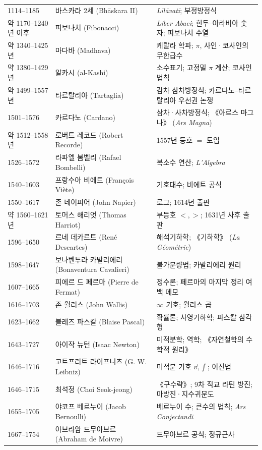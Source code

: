 \begin{center}
\begin{longtable}{@{}L{0.16\textwidth}L{0.24\textwidth}L{0.52\textwidth}@{}}
1114--1185 & 바스카라 2세 (Bhāskara II) & \textit{Līlāvatī}; 부정방정식\\
약 1170--1240년 이후 & 피보나치 (Fibonacci) & \textit{Liber Abaci}; 힌두--아라비아 숫자; 피보나치 수열\\
약 1340--1425년 & 마다바 (Madhava) & 케랄라 학파; $\pi$, 사인·코사인의 무한급수\\
약 1380--1429년 & 알카시 (al-Kashi) & 소수표기; 고정밀 $\pi$ 계산; 코사인 법칙\\
약 1499--1557년 & 타르탈리아 (Tartaglia) & 감차 삼차방정식; 카르다노--타르탈리아 우선권 논쟁\\
1501--1576 & 카르다노 (Cardano) & 삼차·사차방정식; 《아르스 마그나》 (\textit{Ars Magna})\\
약 1512--1558년 & 로버트 레코드 (Robert Recorde) & 1557년 등호 $=$ 도입\\
1526--1572 & 라파엘 봄벨리 (Rafael Bombelli) & 복소수 연산; \textit{L'Algebra}\\
1540--1603 & 프랑수아 비에트 (François Viète) & 기호대수; 비에트 공식\\
1550--1617 & 존 네이피어 (John Napier) & 로그; 1614년 출판\\
약 1560--1621년 & 토머스 해리엇 (Thomas Harriot) & 부등호 $<,>$; 1631년 사후 출판\\
1596--1650 & 르네 데카르트 (René Descartes) & 해석기하학; 《기하학》 (\textit{La Géométrie})\\
1598--1647 & 보나벤투라 카발리에리 (Bonaventura Cavalieri) & 불가분량법; 카발리에리 원리\\
1607--1665 & 피에르 드 페르마 (Pierre de Fermat) & 정수론; 페르마의 마지막 정리 여백 메모\\
1616--1703 & 존 월리스 (John Wallis) & $\infty$ 기호; 월리스 곱\\
1623--1662 & 블레즈 파스칼 (Blaise Pascal) & 확률론; 사영기하학; 파스칼 삼각형\\
1643--1727 & 아이작 뉴턴 (Isaac Newton) & 미적분학; 역학; 《자연철학의 수학적 원리》\\
1646--1716 & 고트프리트 라이프니츠 (G. W. Leibniz) & 미적분 기호 $\dd,\int$; 이진법\\
1646--1715 & 최석정 (Choi Seok-jeong) & 《구수략》; 9차 직교 라틴 방진; 마방진·지수귀문도\\
1655--1705 & 야코프 베르누이 (Jacob Bernoulli) & 베르누이 수; 큰수의 법칙; \textit{Ars Conjectandi}\\
1667--1754 & 아브라암 드무아브르 (Abraham de Moivre) & 드무아브르 공식; 정규근사\\

\end{longtable}
\end{center}
